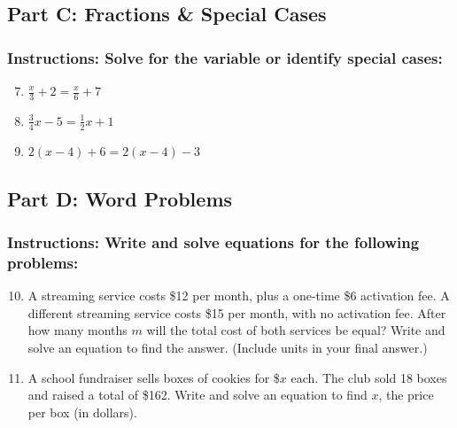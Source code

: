 \documentclass[12pt]{article}
\begin{document}
        \subsection*{Part C: Fractions \& Special Cases}
            
            \subsubsection*{Instructions: Solve for the variable or identify special cases:}

                \begin{enumerate}
                    \setcounter{enumi}{6}
                    \item $\frac{x}{3} + 2 = \frac{x}{6} + 7$
                    \item $\frac{3}{4}x - 5 = \frac{1}{2}x + 1$
                    \item $2(x - 4) + 6 = 2(x - 4) - 3$
                \end{enumerate}
        
        \subsection*{Part D: Word Problems}
        
            \subsubsection*{Instructions: Write and solve equations for the following problems:}

                \begin{enumerate}
                    \setcounter{enumi}{9}
                    \item A streaming service costs \$12 per month, plus a one-time \$6 activation fee. A different streaming service costs \$15 per month, with no activation fee. After how many months $m$ will the total cost of both services be equal? Write and solve an equation to find the answer. (Include units in your final answer.)
                    
                    \item A school fundraiser sells boxes of cookies for \$$x$ each. The club sold 18 boxes and raised a total of \$162. Write and solve an equation to find $x$, the price per box (in dollars).
                \end{enumerate}

                \newpage
\end{document}
